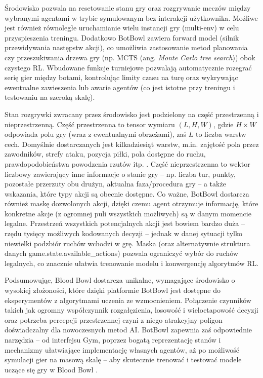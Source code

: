 Środowisko pozwala na resetowanie stanu gry oraz rozgrywanie meczów między wybranymi agentami w trybie symulowanym bez interakcji użytkownika. Możliwe jest również równoległe uruchamianie wielu instancji gry (multi-env) w celu przyspieszenia treningu. Dodatkowo BotBowl zawiera forward model (silnik przewidywania następstw akcji), co umożliwia zastosowanie metod planowania czy przeszukiwania drzewa gry (np. MCTS (ang. \textit{Monte Carlo tree search})) obok czystego RL. Wbudowane funkcje turniejowe pozwalają automatycznie rozegrać serię gier między botami, kontrolując limity czasu na turę oraz wykrywając ewentualne zawieszenia lub awarie agentów (co jest istotne przy treningu i testowaniu na szeroką skalę).

Stan rozgrywki zwracany przez środowisko jest podzielony na część przestrzenną i nieprzestrzenną. Część przestrzenna to tensor wymiaru $(L, H, W)$, gdzie $H \times W$ odpowiada polu gry (wraz z ewentualnymi obrzeżami), zaś $L$ to liczba warstw cech. Domyślnie dostarczanych jest kilkadziesiąt warstw, m.in. zajętość pola przez zawodników, strefy ataku, pozycja piłki, pola dostępne do ruchu, prawdopodobieństwa powodzenia rzutów itp. . Część nieprzestrzenna to wektor liczbowy zawierający inne informacje o stanie gry – np. liczba tur, punkty, pozostałe przerzuty obu drużyn, aktualna faza/procedura gry – a także wskazania, które typy akcji są obecnie dostępne. Co ważne, BotBowl dostarcza również maskę dozwolonych akcji, dzięki czemu agent otrzymuje informację, które konkretne akcje (z ogromnej puli wszystkich możliwych) są w danym momencie legalne. Przestrzeń wszystkich potencjalnych akcji jest bowiem bardzo duża – rzędu tysięcy możliwych kodowanych decyzji – jednak w danej sytuacji tylko niewielki podzbiór ruchów wchodzi w grę. Maska (oraz alternatywnie struktura danych game.state.available\_actions) pozwala ograniczyć wybór do ruchów legalnych, co znacznie ułatwia trenowanie modelu i konwergencję algorytmów RL.

Podsumowując, Blood Bowl dostarcza unikalne, wymagające środowisko o wysokiej złożoności, które dzięki platformie BotBowl jest dostępne do eksperymentów z algorytmami uczenia ze wzmocnieniem. Połączenie czynników takich jak ogromny współczynnik rozgałęzienia, losowość i wieloetapowość decyzji oraz potrzeba percepcji przestrzennej czyni z niego atrakcyjny poligon doświadczalny dla nowoczesnych metod AI. BotBowl zapewnia zaś odpowiednie narzędzia – od interfejsu Gym, poprzez bogatą reprezentację stanów i mechanizmy ułatwiające implementację własnych agentów, aż po możliwość symulacji gier na masową skalę – aby skutecznie trenować i testować modele uczące się gry w Blood Bowl \cite{botbowl_docs}.

